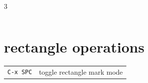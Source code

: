 \documentclass[11pt,landscape,a4paper]{article}
\begin{document}
\begin{multicols}{3}
\begin{tabular}{@{}ll@{}}
\end{tabular}

%
%


\section{rectangle operations}


\begin{tabular}{@{}ll@{}}
	\verb|C-x SPC| 		& toggle rectangle mark mode\\ 
	
\end{tabular}



%
%
%
%
%
%
%


\end{multicols}
\end{document}
